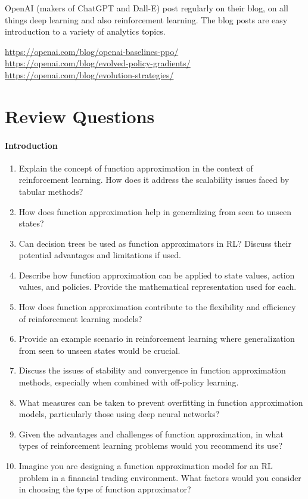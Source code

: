 OpenAI (makers of ChatGPT and Dall-E) post regularly on their blog, on all things deep learning and also reinforcement learning. The blog posts are easy introduction to a variety of analytics topics. \\

\begin{tcolorbox}[colback=code]
\footnotesize
\url{https://openai.com/blog/openai-baselines-ppo/} \\

\url{https://openai.com/blog/evolved-policy-gradients/} \\

\url{https://openai.com/blog/evolution-strategies/}
\end{tcolorbox}

\section{Review Questions}

\paragraph*{Introduction}
\begin{enumerate}[nosep]
	\item Explain the concept of function approximation in the context of reinforcement learning. How does it address the scalability issues faced by tabular methods?
    \item How does function approximation help in generalizing from seen to unseen states?
    \item Can decision trees be used as function approximators in RL? Discuss their potential advantages and limitations if used.
    \item Describe how function approximation can be applied to state values, action values, and policies. Provide the mathematical representation used for each.
    \item How does function approximation contribute to the flexibility and efficiency of reinforcement learning models?
    \item Provide an example scenario in reinforcement learning where generalization from seen to unseen states would be crucial.
    \item Discuss the issues of stability and convergence in function approximation methods, especially when combined with off-policy learning.
    \item What measures can be taken to prevent overfitting in function approximation models, particularly those using deep neural networks?
    \item Given the advantages and challenges of function approximation, in what types of reinforcement learning problems would you recommend its use?
    \item Imagine you are designing a function approximation model for an RL problem in a financial trading environment. What factors would you consider in choosing the type of function approximator? 
 \end{enumerate}

